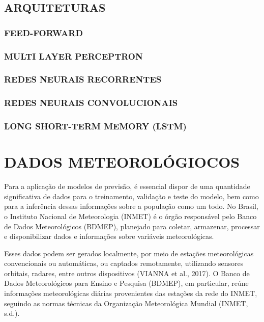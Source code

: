     \subsection{ARQUITETURAS}
        \subsubsection{FEED-FORWARD}
        \subsubsection{MULTI LAYER PERCEPTRON}
        \subsubsection{REDES NEURAIS RECORRENTES}
        \subsubsection{REDES NEURAIS CONVOLUCIONAIS}
        \subsubsection{LONG SHORT-TERM MEMORY (LSTM)}
    

\section{DADOS METEOROLÓGIOCOS}

    Para a aplicação de modelos de previsão, é essencial dispor de uma quantidade significativa de dados para o 
    treinamento, validação e teste do modelo, bem como para a inferência dessas informações sobre a população como um 
    todo. No Brasil, o Instituto Nacional de Meteorologia (INMET) é o órgão responsável pelo Banco de Dados 
    Meteorológicos (BDMEP), planejado para coletar, armazenar, processar e disponibilizar dados e informações sobre 
    variáveis meteorológicas. 
    
    Esses dados podem ser gerados localmente, por meio de estações meteorológicas convencionais ou automáticas, 
    ou captados remotamente, utilizando sensores orbitais, radares, entre outros dispositivos (VIANNA et al., 2017). 
    O Banco de Dados Meteorológicos para Ensino e Pesquisa (BDMEP), em particular, reúne informações meteorológicas 
    diárias provenientes das estações da rede do INMET, seguindo as normas técnicas da Organização Meteorológica 
    Mundial (INMET, s.d.).